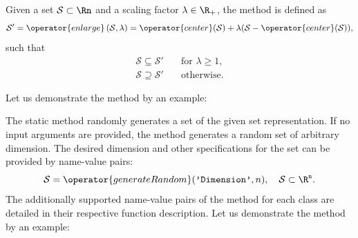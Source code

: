 \vspace{1cm}

\label{sec:enlarge}

Given a set $\mathcal{S} \subset \Rn$ and a scaling factor $\lambda\in\R_+$, the method  is defined as
\begin{equation*}
	\mathcal{S}' = \operator{enlarge}\left(\mathcal{S}, \lambda \right) = \operator{center}(\mathcal{S}) + \lambda (\mathcal{S} - \operator{center}(\mathcal{S})),
\end{equation*}
such that
\begin{align*}
	\mathcal{S} \subseteq \mathcal{S}' &\quad \text{for } \lambda \geq 1, \\
	\mathcal{S} \supseteq \mathcal{S}' &\quad \text{otherwise}.
\end{align*}

Let us demonstrate the method  by an example:

\begin{center}
	\begin{minipage}[t]{0.50\textwidth}
		\vspace{10pt}
		\footnotesize
		
	\end{minipage}
	\begin{minipage}[t]{0.3\textwidth}
		\vspace{0pt}
		\centering
	\end{minipage}
\end{center}

\vspace{1cm}


The static method  randomly generates a set of the given set representation. If no input arguments are provided, the method generates a random set of arbitrary dimension. The desired dimension and other specifications for the set can be provided by name-value pairs:
\begin{equation*}
	\mathcal{S} = \operator{generateRandom}(\texttt{'Dimension'},n), ~~~ \mathcal{S} \subset \R^{\texttt{n}}.
\end{equation*}
The additionally supported name-value pairs of the method  for each class are detailed in their respective function description. Let us demonstrate the method  by an example:

